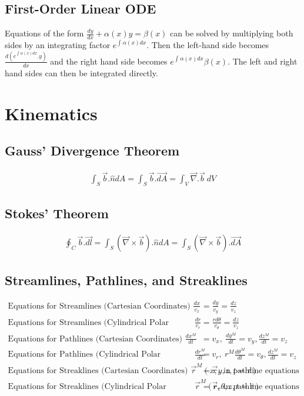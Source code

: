 \documentclass[11pt, letterpaper, notitlepage]{article}
\begin{document}
\subsection{First-Order Linear ODE}
Equations of the form $\frac{dy}{dx} + \alpha(x) y = \beta(x)$ can be solved by multiplying both sides by an integrating factor $e^{\int_{}^{}\alpha(x)dx}$. Then the left-hand side becomes $\frac{d(e^{\int_{}^{}\alpha(x)dx}.y)}{dx}$ and the right hand side becomes $e^{\int_{}^{}\alpha(x)dx} \beta(x)$. The left and right hand sides can then be integrated directly.

\newpage
\section{Kinematics}

\subsection{Gauss' Divergence Theorem}
\begin{align*}
  \int_S \vec{b} . \hat{n} d A =  \int_S \vec{b} . \vec{d A} = \int_V \vec{\nabla} . \vec{b}\ d V
\end{align*}

\subsection{Stokes' Theorem}
\begin{align*}
  \oint_C \vec{b} . \vec{dl} =  \int_S (\vec{\nabla} \times \vec{b}) . \hat{n} d A = \int_S (\vec{\nabla} \times \vec{b}) . \vec{d A}
\end{align*}

\subsection{Streamlines, Pathlines, and Streaklines}
\begin{align*}
\text{Equations for Streamlines (Cartesian Coordinates) } \frac{dx}{v_x} &= \frac{dy}{v_y} = \frac{dz}{v_z} \\
\text{Equations for Streamlines (Cylindrical Polar Coordinates) } \frac{dr}{v_r} &= \frac{r d \theta}{v_\theta} = \frac{dz}{v_z} \\
\text{Equations for Pathlines (Cartesian Coordinates) } \frac{d x^M}{d t} &= v_x,\ \frac{d y^M}{d t} = v_y, \frac{d z^M}{d t} = v_z \\
\text{Equations for Pathlines (Cylindrical Polar Coordinates) } \frac{d r^M}{d t} &= v_r,\ r^M \frac{d \theta^M}{d t} = v_\theta, \frac{d z^M}{d t} = v_z \\
\text{Equations for Streaklines (Cartesian Coordinates) } \vec{r}^M(x, y, z, t=\tau) &= \vec{r}_\tau \text{ in pathline equations} \\
\text{Equations for Streaklines (Cylindrical Polar Coordinates) } \vec{r}^M(r, \theta, z, t=\tau) &= \vec{r}_\tau \text{ in pathline equations}
\end{align*}
\end{document}
